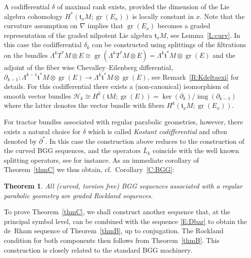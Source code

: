 \documentclass[reqno,12pt]{amsart}
\DeclareMathOperator{\img}{img}
\DeclareMathOperator{\gr}{gr}
\newcounter{ABC}
\theoremstyle{plain}
\newtheorem{thm}[ABC]{Theorem}
\theoremstyle{definition}
\begin{document}
A codifferential $\delta$ of maximal rank exists, provided the dimension of the Lie algebra cohomology $H^*(\mathfrak t_xM;\gr(E_x))$ is locally constant in $x$.
Note that the curvature assumption on $\nabla$ implies that $\gr(E_x)$ becomes a graded representation of the graded nilpotent Lie algebra $\mathfrak t_xM$, see Lemma~\ref{L:curv}.
In this case the codifferential $\delta_k$ can be constructed using splittings of the filtrations on the bundles $\Lambda^kT^*M\otimes E\cong\gr(\Lambda^kT^*M\otimes E)=\Lambda^k\mathfrak t^*M\otimes\gr(E)$ and the adjoint of the fiber wise Chevalley--Eilenberg differential, $\partial_{k-1}\colon\Lambda^{k-1}\mathfrak t^*M\otimes\gr(E)\to\Lambda^k\mathfrak t^*M\otimes\gr(E)$, see Remark~\ref{R:Kdeltaexi} for details.
For this codifferential there exists a (non-canonical) isomorphism of smooth vector bundles $\mathcal H_k\cong H^k(\mathfrak tM;\gr(E))=\ker(\partial_k)/\img(\partial_{k-1})$ where the latter denotes the vector bundle with fibers $H^k(\mathfrak t_xM;\gr(E_x))$.


For tractor bundles associated with regular parabolic geometries, however, there exists a natural choice for $\delta$ which is called \emph{Kostant codifferential} and often denoted by $\partial^*$.
In this case the construction above reduces to the construction of the curved BGG sequences, and the operators $\bar L_k$ coincide with the well known splitting operators, see \cite[Theorem~2.4]{CS12} for instance.
As an immediate corollary of Theorem~\ref{thmC} we thus obtain, cf.\ Corollary~\ref{C:BGG}:


\begin{thm}\label{thmD}
All (curved, torsion free) BGG sequences associated with a regular parabolic geometry are graded Rockland sequences.
\end{thm}


To prove Theorem~\ref{thmC}, we shall construct another sequence that, at the principal symbol level, can be combined with the sequence \eqref{E:Dbar} to obtain the de~Rham sequence of Theorem~\ref{thmB}, up to conjugation. 
The Rockland condition for both components then follows from Theorem~\ref{thmB}.
This construction is closely related to the standard BGG machinery.
\end{document}
